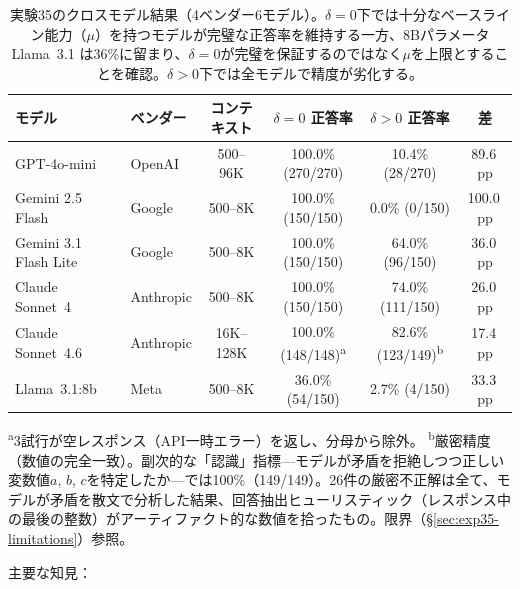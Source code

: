 \documentclass[11pt,a4paper]{article}
\begin{document}
\begin{table}[h]
\centering
\small
\begin{tabular}{llcccc}
\toprule
\textbf{モデル} & \textbf{ベンダー} & \textbf{コンテキスト} & \textbf{$\delta = 0$ 正答率} & \textbf{$\delta > 0$ 正答率} & \textbf{差} \\
\midrule
GPT-4o-mini           & OpenAI    & 500--96K   & 100.0\% (270/270) & 10.4\% (28/270)   & 89.6\,pp \\
Gemini 2.5 Flash      & Google    & 500--8K    & 100.0\% (150/150) & 0.0\% (0/150)     & 100.0\,pp \\
Gemini 3.1 Flash Lite & Google    & 500--8K    & 100.0\% (150/150) & 64.0\% (96/150)   & 36.0\,pp \\
Claude Sonnet~4       & Anthropic & 500--8K    & 100.0\% (150/150) & 74.0\% (111/150)  & 26.0\,pp \\
Claude Sonnet~4.6     & Anthropic & 16K--128K  & 100.0\% (148/148)\textsuperscript{a} & 82.6\% (123/149)\textsuperscript{b} & 17.4\,pp \\
Llama~3.1:8b          & Meta      & 500--8K    & 36.0\% (54/150)   & 2.7\% (4/150)     & 33.3\,pp \\
\bottomrule
\end{tabular}

\vspace{2pt}
{\footnotesize \textsuperscript{a}3試行が空レスポンス（API一時エラー）を返し、分母から除外。
\textsuperscript{b}厳密精度（数値の完全一致）。副次的な「認識」指標---モデルが矛盾を拒絶しつつ正しい変数値$a$, $b$, $c$を特定したか---では100\%（149/149）。26件の厳密不正解は全て、モデルが矛盾を散文で分析した結果、回答抽出ヒューリスティック（レスポンス中の最後の整数）がアーティファクト的な数値を拾ったもの。限界（\S\ref{sec:exp35-limitations}）参照。}

\caption{実験35のクロスモデル結果（4ベンダー6モデル）。$\delta = 0$下では十分なベースライン能力（$\mu$）を持つモデルが完璧な正答率を維持する一方、8Bパラメータ Llama~3.1 は36\%に留まり、$\delta = 0$が完璧を保証するのではなく$\mu$を上限とすることを確認。$\delta > 0$下では全モデルで精度が劣化する。}
\label{tab:exp35}
\end{table}

\noindent 主要な知見：
\end{document}
